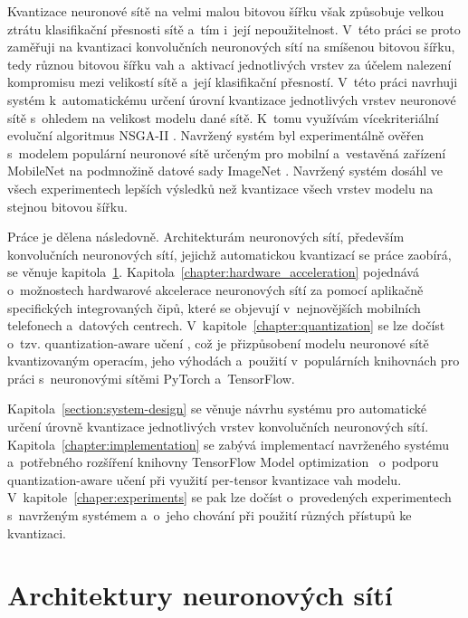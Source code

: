Kvantizace neuronové sítě na velmi malou bitovou šířku však způsobuje velkou ztrátu klasifikační přesnosti sítě a~tím i~její nepoužitelnost.
V~této práci se proto zaměřuji na kvantizaci konvolučních neuronových sítí na smíšenou bitovou šířku, tedy různou bitovou šířku vah a~aktivací jednotlivých vrstev za účelem nalezení kompromisu mezi velikostí sítě a~její klasifikační přesností.
V~této práci navrhuji systém k~automatickému určení úrovní kvantizace jednotlivých vrstev neuronové sítě s~ohledem na velikost modelu dané sítě. K~tomu využívám vícekriteriální evoluční algoritmus NSGA-II \cite{996017}. Navržený systém byl experimentálně ověřen s~modelem populární neuronové sítě určeným pro mobilní a~vestavěná zařízení MobileNet \cite{howard2017mobilenets} na podmnožině datové sady ImageNet \cite{5206848}. Navržený systém dosáhl ve všech experimentech lepších výsledků než kvantizace všech vrstev modelu na stejnou bitovou šířku.

Práce je dělena následovně. Architekturám neuronových sítí, především konvolučních neuronových sítí, jejichž automatickou kvantizací se práce zaobírá, se věnuje kapitola~\ref{chapter:architectures_of_neural_networks}. Kapitola~\ref{chapter:hardware_acceleration} pojednává o~možnostech hardwarové akcelerace neuronových sítí za pomocí aplikačně specifických integrovaných čipů, které se objevují v~nejnovějších mobilních telefonech a~datových centrech. V~kapitole~\ref{chapter:quantization} se lze dočíst o~tzv. quantization-aware učení \cite{https://doi.org/10.48550/arxiv.1712.05877}, což je přizpůsobení modelu neuronové sítě kvantizovaným operacím, jeho výhodách a~použití v~populárních knihovnách pro práci s~neuronovými sítěmi PyTorch a~TensorFlow. 

Kapitola~\ref{section:system-design} se věnuje návrhu systému pro automatické určení úrovně kvantizace jednotlivých vrstev konvolučních neuronových sítí. Kapitola~\ref{chapter:implementation} se zabývá implementací navrženého systému a~potřebného rozšíření knihovny TensorFlow Model optimization~\cite{tf-model-optimization} o~podporu quantization-aware učení při využití per-tensor kvantizace vah modelu. V~kapitole~\ref{chaper:experiments} se pak lze dočíst o~provedených experimentech s~navrženým systémem a~o~jeho chování při použití různých přístupů ke kvantizaci.

\chapter{Architektury neuronových sítí}
\label{chapter:architectures_of_neural_networks}

